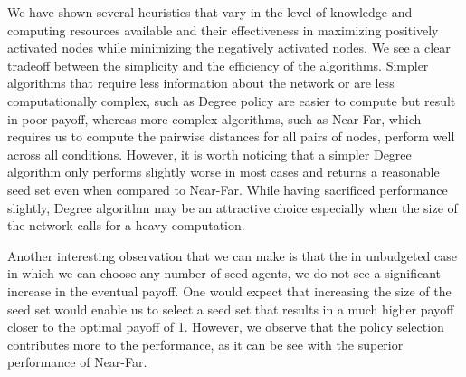 We have shown several heuristics that vary in the level of knowledge and computing resources available and their effectiveness in maximizing positively activated nodes while minimizing the negatively activated nodes. We see a clear tradeoff between the simplicity and the efficiency of the algorithms. Simpler algorithms that require less information about the network or are less computationally complex, such as Degree policy are easier to compute but result in poor payoff, whereas more complex algorithms, such as Near-Far, which requires us to compute the pairwise distances for all pairs of nodes, perform well across all conditions. However, it is worth noticing that a simpler Degree algorithm only performs slightly worse in most cases and returns a reasonable seed set even when compared to Near-Far. While having sacrificed performance slightly, Degree algorithm may be an attractive choice especially when the size of the network calls for a heavy computation.

Another interesting observation that we can make is that the in unbudgeted case in which we can choose any number of seed agents, we do not see a significant increase in the eventual payoff. One would expect that increasing the size of the seed set would enable us to select a seed set that results in a much higher payoff closer to the optimal payoff of 1. However, we observe that the policy selection contributes more to the performance, as it can be see with the superior performance of Near-Far.

